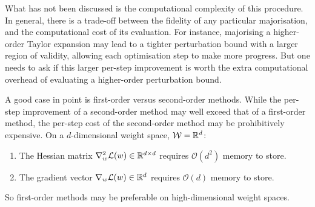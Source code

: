 \begin{refsection}
What has not been discussed is the computational complexity of this procedure. In general, there is a trade-off between the fidelity of any particular majorisation, and the computational cost of its evaluation. For instance, majorising a higher-order Taylor expansion may lead to a tighter perturbation bound with a larger region of validity, allowing each optimisation step to make more progress. But one needs to ask if this larger per-step improvement is worth the extra computational overhead of evaluating a higher-order perturbation bound.

A good case in point is first-order versus second-order methods. While the per-step improvement of a second-order method may well exceed that of a first-order method, the per-step cost of the second-order method may be prohibitively expensive. On a $d$-dimensional weight space, $\mathcal{W}=\mathbb{R}^d$:
\begin{enumerate}
    \item The Hessian matrix $\nabla_w^2\mathcal{L}(w)\in\mathbb{R}^{d\times d}$ requires $\mathcal{O}(d^2)$ memory to store.
    \item The gradient vector $\nabla_w\mathcal{L}(w)\in\mathbb{R}^{d}$ requires $\mathcal{O}(d)$ memory to store.
\end{enumerate}

So first-order methods may be preferable on high-dimensional weight spaces.

\printbibliography[heading=subbibliography]
\end{refsection}

